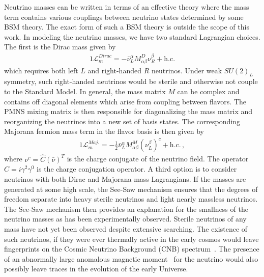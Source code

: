 \documentclass[universe,article,submit,moreauthors,pdftex,a4paper]{Definitions/mdpi}
\begin{document}
Neutrino masses can be written in terms of an effective theory where the mass term contains various couplings between neutrino states determined by some BSM theory. The exact form of such a BSM theory is outside the scope of this work. In modeling the neutrino masses, we have two standard Lagrangian choices. The first is the Dirac mass given by
\begin{alignat}{1}
	\label{DiracMass} \mathcal{L}_{m}^{Dirac} = -\bar{\nu}^{\alpha}_{L}M^{D}_{\alpha\beta}\nu^{\beta}_{R}+\mathrm{h.c.}
\end{alignat}
which requires both left $L$ and right-handed $R$ neutrinos. Under weak $SU(2)_{L}$ symmetry, such right-handed neutrinos would be sterile and otherwise not couple to the Standard Model. In general, the mass matrix $M$ can be complex and contains off diagonal elements which arise from coupling between flavors. The PMNS mixing matrix is then responsible for diagonalizing the mass matrix and reorganizing the neutrinos into a new set of basis states. The corresponding Majorana fermion mass term in the flavor basis is then given by
\begin{alignat}{1}
	\label{Majorana} \mathcal{L}_{m}^{Maj.} = -\frac{1}{2}\bar{\nu}^{\alpha}_{L}M^{M}_{\alpha\beta}(\nu^{\beta}_{L})^{c}+\mathrm{h.c.}\,,
\end{alignat}
where $\nu^{c} = \hat{C}(\bar{\nu})^{T}$ is the charge conjugate of the neutrino field. The operator $\hat{C} = i\gamma^{2}\gamma^{0}$ is the charge conjugation operator. A third option is to consider neutrinos with both Dirac and Majorana mass Lagrangians. If the masses are generated at some high scale, the See-Saw mechanism ensures that the degrees of freedom separate into heavy sterile neutrinos and light nearly massless neutrinos. The See-Saw mechanism then provides an explanation for the smallness of the neutrino masses as has been experimentally observed. Sterile neutrinos of any mass have not yet been observed despite extensive searching. The existence of such neutrinos, if they were ever thermally active in the early cosmos would leave fingerprints on the Cosmic Neutrino Background (CNB) spectrum~\cite{Birrell:2014qna}. The presence of an abnormally large anomalous magnetic moment~\cite{Morgan:1981zy,Fukugita:1987uy,Vogel:1989iv,Elmfors:1997tt,Giunti:2008ve,Giunti:2014ixa,Canas:2015yoa} for the neutrino would also possibly leave traces in the evolution of the early Universe.
\end{document}
